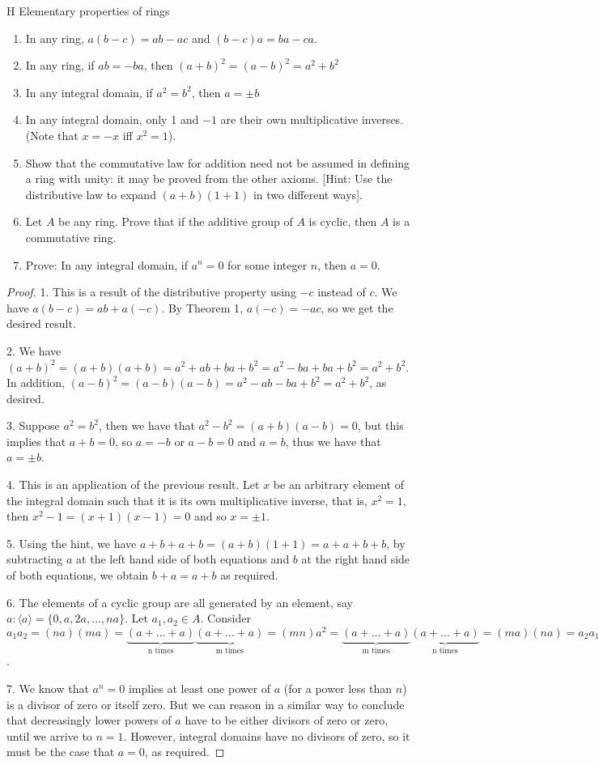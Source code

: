 \begin{exercise}{H Elementary properties of rings}
\begin{enumerate}
    \item In any ring, $a(b-c)=ab-ac$ and $(b-c)a=ba-ca$.
    \item In any ring, if $ab=-ba$, then $(a+b)^{2} =(a-b)^{2} =a^{2}+b^{2}$
    \item In any integral domain, if $a^{2}=b^{2}$, then $a=\pm b$
    \item In any integral domain, only 1 and $-1$ are their own multiplicative inverses. (Note that $x=-x$ iff $x^{2}=1$).
    \item Show that the commutative law for addition need not be assumed in defining a ring with unity: it may be proved from the other axioms. [Hint: Use the distributive law to expand $(a+b)(1+1)$ in two different ways].
    \item Let $A$ be any ring. Prove that if the additive group of $A$ is cyclic, then $A$ is a commutative ring.
    \item Prove: In any integral domain, if $a^{n}=0$ for some integer $n$, then $a=0$.
\end{enumerate}
\end{exercise}
\begin{proof}
 1. This is a result of the distributive property using $-c$ instead of $c$. We have $a(b-c)=ab+a(-c)$. By Theorem 1, $a(-c)=-ac$, so we get the desired result.

 2. We have $(a+b)^{2}=(a+b)(a+b)=a^{2}+ab+ba+b^{2}=a^{2}-ba+ba+b^{2}=a^{2}+b^{2}$. In addition, $(a-b)^{2}=(a-b)(a-b)=a^{2}-ab-ba+b^{2}=a^{2}+b^{2}$, as desired.

 3. Suppose $a^{2}=b^{2}$, then we have that $a^{2}-b^{2}=(a+b)(a-b)=0$, but this implies that $a+b=0$, so $a=-b$ or $a-b=0$ and $a=b$, thus we have that $a=\pm b$.

 4. This is an application of the previous result. Let $x$ be an arbitrary element of the integral domain such that it is its own multiplicative inverse, that is, $x^{2}=1$, then $x^{2}-1=(x+1)(x-1)=0$ and so $x=\pm 1$.

 5. Using the hint, we have $a+b+a+b=(a+b)(1+1)=a+a+b+b$, by subtracting $a$ at the left hand side of both equations and $b$ at the right hand side of both equations, we obtain $b+a=a+b$ as required.

 6. The elements of a cyclic group are all generated by an element, say $a: \langle a\rangle=\{0, a, 2a,\dots,na\}$. Let $a_{1},a_{2}\in A$. Consider $a_{1}a_{2} = (na)(ma) = \underbrace{(a+\dots+a)}_{\text{n times}}\underbrace{(a+\dots+a)}_{\text{m times}} = (mn)a^{2} = \underbrace{(a+\dots+a)}_{\text{m times}}\underbrace{(a+\dots+a)}_{\text{n times}} = (ma)(na)=a_{2}a_{1}$.

 7. We know that $a^{n}=0$ implies at least one power of $a$ (for a power less than $n$) is a divisor of zero or itself zero. But we can reason in a similar way to conclude that decreasingly lower powers of $a$ have to be either divisors of zero or zero, until we arrive to $n=1$. However, integral domains have no divisors of zero, so it must be the case that $a=0$, as required.
\end{proof}


